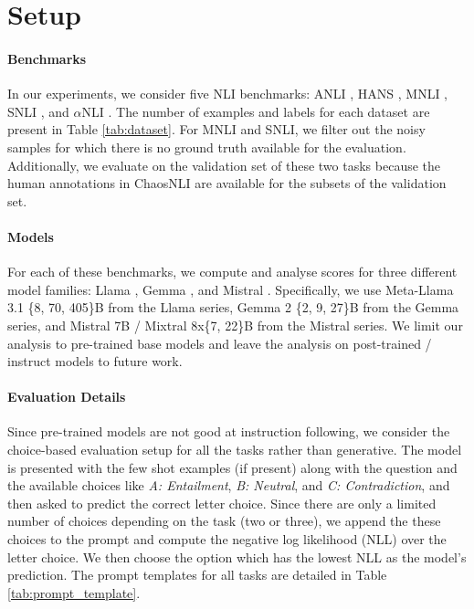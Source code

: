\section{Setup}

\paragraph{Benchmarks} In our experiments, we consider five NLI benchmarks: ANLI \citep{nie-etal-2020-adversarial}, HANS \citep{mccoy-etal-2019-right}, MNLI \citep{williams-etal-2018-broad}, SNLI \citep{bowman-etal-2015-large}, and $\alpha$NLI \citep{bhagavatula2020abductive}. 
The number of examples and labels for each dataset are present in Table \ref{tab:dataset}. 
For MNLI and SNLI, we filter out the noisy samples for which there is no ground truth available for the evaluation. Additionally, we evaluate on the validation set of these two tasks because the human annotations in ChaosNLI are available for the subsets of the validation set. %

\paragraph{Models} For each of these benchmarks, we compute and analyse scores for three different model families: Llama \citep{dubey2024llama}, Gemma \citep{team2024gemma}, and Mistral \citep{jiang2023mistral, jiang2024mixtral}. 
Specifically, we use Meta-Llama 3.1 \{8, 70, 405\}B from the Llama series, Gemma 2 \{2, 9, 27\}B from the Gemma series, and Mistral 7B / Mixtral 8x\{7, 22\}B from the Mistral series.
We limit our analysis to pre-trained base models and leave the analysis on post-trained / instruct models to future work.

\paragraph{Evaluation Details} Since pre-trained models are not good at instruction following, we consider the choice-based evaluation setup for all the tasks rather than generative. The model is presented with the few shot examples (if present) along with the question and the available choices like \textit{A: Entailment}, \textit{B: Neutral}, and \textit{C: Contradiction}, and then asked to predict the correct letter choice. Since there are only a limited number of choices depending on the task (two or three), we append the these choices to the prompt and compute the negative log likelihood (NLL) over the letter choice. We then choose the option which has the lowest NLL as the model's prediction. The prompt templates for all tasks are detailed in Table \ref{tab:prompt_template}.


